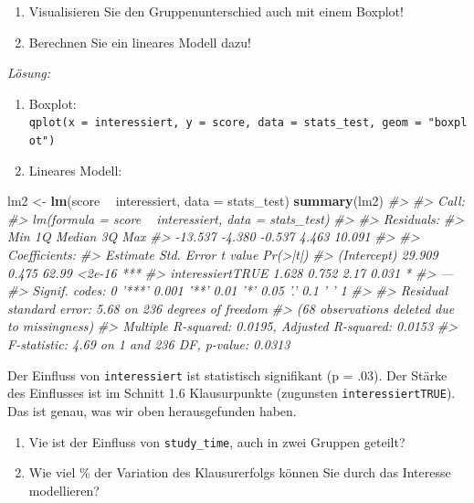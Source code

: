 \documentclass[12pt,ngerman,]{book}
\makeatletter
\newenvironment{Shaded}{\begin{snugshade}}{\end{snugshade}}
\newcommand{\KeywordTok}[1]{\textcolor[rgb]{0.13,0.29,0.53}{\textbf{#1}}}
\newcommand{\DataTypeTok}[1]{\textcolor[rgb]{0.13,0.29,0.53}{#1}}
\newcommand{\StringTok}[1]{\textcolor[rgb]{0.31,0.60,0.02}{#1}}
\newcommand{\CommentTok}[1]{\textcolor[rgb]{0.56,0.35,0.01}{\textit{#1}}}
\newcommand{\OperatorTok}[1]{\textcolor[rgb]{0.81,0.36,0.00}{\textbf{#1}}}
\newcommand{\NormalTok}[1]{#1}
\newenvironment{kframe}{%
\medskip{}
\setlength{\fboxsep}{.8em}
 \def\at@end@of@kframe{}%
 \ifinner\ifhmode%
  \def\at@end@of@kframe{\end{minipage}}%
  \begin{minipage}{\columnwidth}%
 \fi\fi%
 \def\FrameCommand##1{\hskip\@totalleftmargin \hskip-\fboxsep
 \colorbox{shadecolor}{##1}\hskip-\fboxsep
     \hskip-\linewidth \hskip-\@totalleftmargin \hskip\columnwidth}%
 \MakeFramed {\advance\hsize-\width
   \@totalleftmargin\z@ \linewidth\hsize
   \@setminipage}}%
 {\par\unskip\endMakeFramed%
 \at@end@of@kframe}
\renewenvironment{Shaded}{\begin{kframe}}{\end{kframe}}
\theoremstyle{definition}
\theoremstyle{definition}
\theoremstyle{remark}
\let\BeginKnitrBlock\begin \let\EndKnitrBlock\end
\makeatother
\begin{document}
\begin{enumerate}
\def\labelenumi{\arabic{enumi}.}
\item
  Visualisieren Sie den Gruppenunterschied auch mit einem Boxplot!
\item
  Berechnen Sie ein lineares Modell dazu!
\end{enumerate}

\emph{Lösung:}

\begin{enumerate}
\def\labelenumi{\arabic{enumi}.}
\item
  Boxplot:
  \texttt{qplot(x\ =\ interessiert,\ y\ =\ score,\ data\ =\ stats\_test,\ geom\ =\ "boxplot")}
\item
  Lineares Modell:
\end{enumerate}

\begin{Shaded}
\begin{Highlighting}[]
\NormalTok{lm2 <-}\StringTok{ }\KeywordTok{lm}\NormalTok{(score }\OperatorTok{~}\StringTok{ }\NormalTok{interessiert, }\DataTypeTok{data =}\NormalTok{ stats_test)}
\KeywordTok{summary}\NormalTok{(lm2)}
\CommentTok{#> }
\CommentTok{#> Call:}
\CommentTok{#> lm(formula = score ~ interessiert, data = stats_test)}
\CommentTok{#> }
\CommentTok{#> Residuals:}
\CommentTok{#>     Min      1Q  Median      3Q     Max }
\CommentTok{#> -13.537  -4.380  -0.537   4.463  10.091 }
\CommentTok{#> }
\CommentTok{#> Coefficients:}
\CommentTok{#>                  Estimate Std. Error t value Pr(>|t|)    }
\CommentTok{#> (Intercept)        29.909      0.475   62.99   <2e-16 ***}
\CommentTok{#> interessiertTRUE    1.628      0.752    2.17    0.031 *  }
\CommentTok{#> ---}
\CommentTok{#> Signif. codes:  0 '***' 0.001 '**' 0.01 '*' 0.05 '.' 0.1 ' ' 1}
\CommentTok{#> }
\CommentTok{#> Residual standard error: 5.68 on 236 degrees of freedom}
\CommentTok{#>   (68 observations deleted due to missingness)}
\CommentTok{#> Multiple R-squared:  0.0195, Adjusted R-squared:  0.0153 }
\CommentTok{#> F-statistic: 4.69 on 1 and 236 DF,  p-value: 0.0313}
\end{Highlighting}
\end{Shaded}

Der Einfluss von \texttt{interessiert} ist statistisch signifikant (p =
.03). Der Stärke des Einflusses ist im Schnitt 1.6 Klausurpunkte
(zugunsten \texttt{interessiertTRUE}). Das ist genau, was wir oben
herausgefunden haben.

\BeginKnitrBlock{rmdexercises}
\begin{enumerate}
\def\labelenumi{\arabic{enumi}.}
\setcounter{enumi}{2}
\item
  Vie ist der Einfluss von \texttt{study\_time}, auch in zwei Gruppen
  geteilt?
\item
  Wie viel \% der Variation des Klausurerfolgs können Sie durch das
  Interesse modellieren?
\end{enumerate}
\EndKnitrBlock{rmdexercises}
\end{document}

